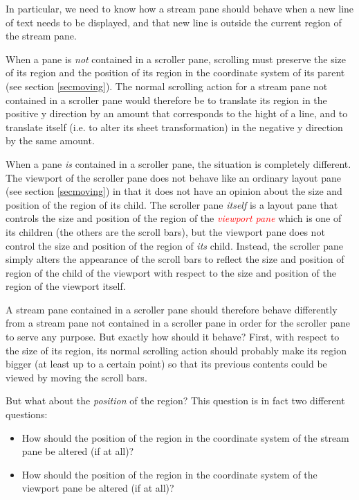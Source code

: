 \documentclass{article}
\newenvironment{itemize0}{
\begin{itemize}
\setlength{\parskip}{0cm}%
}
{\end{itemize}}
\newcommand{\gloss}[1]{\textsl{\textcolor{red}{#1}}}
\begin{document}
In particular, we need to know how a stream pane should behave when a
new line of text needs to be displayed, and that new line is outside
the current region of the stream pane.

When a pane is \emph{not} contained in a scroller pane, scrolling must
preserve the size of its region and the position of its region in the
coordinate system of its parent (see section \ref{secmoving}).  The
normal scrolling action for a stream pane not contained in a scroller
pane would therefore be to translate its region in the positive y
direction by an amount that corresponds to the hight of a line, and to
translate itself (i.e. to alter its sheet transformation) in the
negative y direction by the same amount.

When a pane \emph{is} contained in a scroller pane, the situation is
completely different.  The viewport of the scroller pane does not
behave like an ordinary layout pane (see section \ref{secmoving}) in
that it does not have an opinion about the size and position of the
region of its child.  The scroller pane \emph{itself} is a layout pane
that controls the size and position of the region of the
\gloss{viewport pane} which is one of its children (the others are the
scroll bars), but the viewport pane does not control the size and
position of the region of \emph{its} child.  Instead, the scroller
pane simply alters the appearance of the scroll bars to reflect the
size and position of region of the child of the viewport with respect
to the size and position of the region of the viewport itself.

A stream pane contained in a scroller pane should therefore behave
differently from a stream pane not contained in a scroller pane in
order for the scroller pane to serve any purpose.  But exactly how
should it behave?  First, with respect to the size of its region, its
normal scrolling action should probably make its region bigger (at
least up to a certain point) so that its previous contents could be
viewed by moving the scroll bars.  

But what about the \emph{position} of the region?  This question is in
fact two different questions:

\begin{itemize0}
\item How should the position of the region in the coordinate system of the
stream pane be altered (if at all)?
\item How should the position of the region in the coordinate system of the
viewport pane be altered (if at all)?
\end{itemize0}
\end{document}
